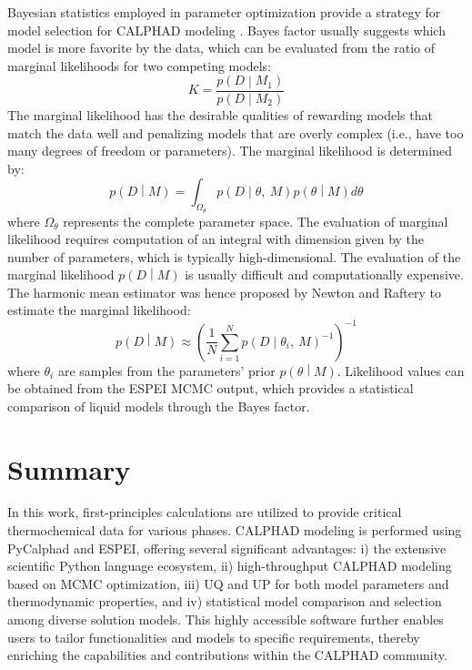 Bayesian statistics employed in parameter optimization provide a strategy for model selection for CALPHAD modeling \cite{paulson2019bayesian, honarmandi2019bayesian}. Bayes factor usually suggests which model is more favorite by the data, which can be evaluated from the ratio of marginal likelihoods for two competing models:
\begin{equation} \label{method:eq:BayesFactor}
    K=\frac{p\left(D\middle| M_1\right)}{p\left(D\middle| M_2\right)}
\end{equation}
The marginal likelihood has the desirable qualities of rewarding models that match the data well and penalizing models that are overly complex (i.e., have too many degrees of freedom or parameters). The marginal likelihood is determined by:
\begin{equation} \label{method:eq:BayesEvd}
    p\left(D\middle| M\right)=\int_{\Omega_\theta}^{\ }{p\left(D\middle|\theta,\ M\right)p\left(\theta\middle| M\right)d\theta}
\end{equation}
where $\Omega_\theta$ represents the complete parameter space. The evaluation of marginal likelihood requires computation of an integral with dimension given by the number of parameters, which is typically high-dimensional. The evaluation of the marginal likelihood $p\left(D\middle| M\right)$ is usually difficult and computationally expensive. The harmonic mean estimator was hence proposed by Newton and Raftery \cite{newton1994approximate} to estimate the marginal likelihood: 
\begin{equation} \label{method:eq:BayesHME}
    p\left(D\middle| M\right)\approx(\frac{1}{N}\sum_{i=1}^{N}{p\left(D\middle|\theta_i,\ M\right)}^{-1})^{-1}
\end{equation}
where $\theta_i$ are samples from the parameters’ prior $p\left(\theta\middle| M\right)$. Likelihood values can be obtained from the ESPEI MCMC output, which provides a statistical comparison of liquid models through the Bayes factor. 

\section{Summary} \label{method:ssec:summary}
In this work, first-principles calculations are utilized to provide critical thermochemical data for various phases. CALPHAD modeling is performed using PyCalphad and ESPEI, offering several significant advantages: i) the extensive scientific Python language ecosystem, ii) high-throughput CALPHAD modeling based on MCMC optimization, iii) UQ and UP for both model parameters and thermodynamic properties, and iv) statistical model comparison and selection among diverse solution models. This highly accessible software further enables users to tailor functionalities and models to specific requirements, thereby enriching the capabilities and contributions within the CALPHAD community.